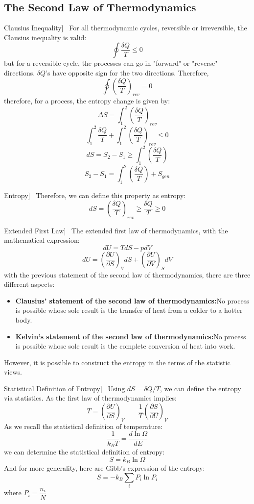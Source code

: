 \documentclass[UTF8]{book}
\newenvironment{theorem}[2][Theorem]{\begin{trivlist}
\item[\hskip \labelsep {\bfseries #1}\hskip \labelsep {\bfseries }]}{\end{trivlist}}
\begin{document}
\subsection{The Second Law of Thermodynamics}
\begin{theorem}
[Clausius Inequality]~ {For all thermodynamic cycles, reversible or irreversible, the Clausius inequality is valid:}
$$\oint \dfrac{\delta Q}{T}\leq 0$$
 {but for a reversible cycle, the processes can go in "forward" or "reverse" directions. $\delta Q$'s have opposite sign for the two directions. Therefore,}
$$\oint \left(\dfrac{\delta Q}{T}\right)_{rev}=0$$
 {therefore, for a process, the entropy change is given by: }
$$\Delta S=\int_{1}^{2}\left(\dfrac{\delta Q}{T}\right)_{rev}$$
$$\int_{1}^{2}\dfrac{\delta Q}{T}+\int_{1}^{2}\left(\dfrac{\delta Q}{T}\right)_{rev}\leq 0$$
$$dS=S_2-S_1\geq \int_{1}^{2}\left(\dfrac{\delta Q}{T}\right)$$
$$S_2-S_1=\int_{1}^{2}\left(\dfrac{\delta Q}{T}\right)+S_{gen}$$
\end{theorem}
\begin{theorem}
[Entropy]~  {Therefore, we can define this property as entropy:}
$$dS=\left(\dfrac{\delta Q}{T}\right)_{rev}\geq \dfrac{\delta Q}{T}\geq 0$$
\end{theorem}
\begin{theorem}
[Extended First Law]~  {The extended first law of thermodynamics, with the mathematical expression:}
$$\boxed{dU=TdS-pdV}$$
$$dU=\left(\dfrac{\partial U}{\partial S}\right)_VdS+\left(\dfrac{\partial U}{\partial V}\right)_SdV$$
 {with the previous statement of the second law of thermodynamics, there are three different aspects:}
\begin{itemize}
\item  {\textbf{Clausius' statement of the second law of thermodynamics:}No process is possible whose sole result is the transfer of heat from a colder to a hotter body.}
\item  {\textbf{Kelvin's statement of the second law of thermodynamics:}No process is possible whose sole result is the complete conversion of heat into work.}
\end{itemize}
\end{theorem}
 {However, it is possible to construct the entropy in the terms of the statistic views.}
\begin{theorem}
[Statistical Definition of Entropy]~  { Using $dS=\delta Q/T$, we can define the entropy via statistics. As the first law of thermodynamics implies:}
$$T=\left(\dfrac{\partial U}{\partial S}\right)_V \qquad \dfrac{1}{T}\left(\dfrac{\partial S}{\partial U}\right)_V$$
 {As we recall the statistical definition of temperature:}
$$\dfrac{1}{k_BT}=\dfrac{d\ln \Omega}{dE}$$
 {we can determine the statistical definition of entropy:}
$$\boxed{S=k_B\ln \Omega }$$
 {And for more generality, here are Gibb's expression of the entropy:}
$$S=-k_B\sum_{i}P_i\ln P_i$$
 {where $P_i=\dfrac{n_i}{N}$}
\end{theorem}
\end{document}
